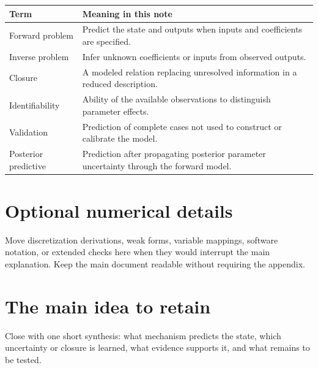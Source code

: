 \documentclass[11pt]{article}
\begin{document}
\begin{center}
\begin{tabularx}{0.94\textwidth}{L{0.25\textwidth}Y}
\toprule
Term & Meaning in this note \\
\midrule
Forward problem & Predict the state and outputs when inputs and coefficients are specified. \\
Inverse problem & Infer unknown coefficients or inputs from observed outputs. \\
Closure & A modeled relation replacing unresolved information in a reduced description. \\
Identifiability & Ability of the available observations to distinguish parameter effects. \\
Validation & Prediction of complete cases not used to construct or calibrate the model. \\
Posterior predictive & Prediction after propagating posterior parameter uncertainty through the forward model. \\
\bottomrule
\end{tabularx}
\end{center}

\appendix
\section{Optional numerical details}

Move discretization derivations, weak forms, variable mappings, software notation, or extended checks here when they would interrupt the main explanation. Keep the main document readable without requiring the appendix.

\section{The main idea to retain}

Close with one short synthesis: what mechanism predicts the state, which uncertainty or closure is learned, what evidence supports it, and what remains to be tested.
\end{document}
